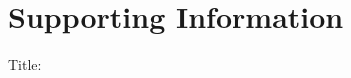 \documentclass[letterpaper,12pt]{article}
\makeatletter
\newcommand{\ifblind}[2]{#1}
\let\msTitle\@title
\let\msAuthor\@author
\makeatother
\begin{document}
\singlespacing

\section*{Supporting Information}
\hangindent=1cm
\noindent Title: \msTitle

\ifblind{}{%
\bigskip
{\noindent Authors: \msAuthor}
}

\newpage
\singlespacing


\clearpage


\clearpage



\end{document}
